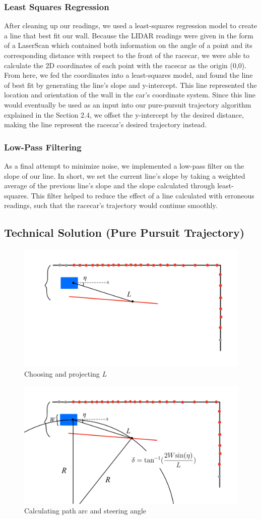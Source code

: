 \documentclass{article}
\begin{document}
\subsubsection{Least Squares Regression}
After cleaning up our readings, we used a least-squares regression model to create a line that best fit our wall. Because the LIDAR readings were given in the form of a LaserScan which contained both information on the angle of a point and its corresponding distance with respect to the front of the racecar, we were able to calculate the 2D coordinates of each point with the racecar as the origin (0,0). From here, we fed the coordinates into a least-squares model, and found the line of best fit by generating the line’s slope and y-intercept. This line represented the location and orientation of the wall in the car’s coordinate system. Since this line would eventually be used as an input into our pure-pursuit trajectory algorithm explained in the Section 2.4, we offset the y-intercept by the desired distance, making the line represent the racecar’s desired trajectory instead.

\subsubsection{Low-Pass Filtering}
As a final attempt to minimize noise, we implemented a low-pass filter on the slope of our line. In short, we set the current line’s slope by taking a weighted average of the previous line’s slope and the slope calculated through least-squares. This filter helped to reduce the effect of a line calculated with erroneous readings, such that the racecar’s trajectory would continue smoothly.

\subsection{Technical Solution (Pure Pursuit Trajectory)}
\begin{figure}[h!]
\centering
\includegraphics[width=.6\columnwidth]{Screenshot (157).png}
\caption{Choosing and projecting \textit{L}}
\end{figure}
\begin{figure}[h!]
\centering
\includegraphics[width=.6\columnwidth]{Screenshot (159).png}
\caption{Calculating path arc and steering angle}
\end{figure}
\end{document}
